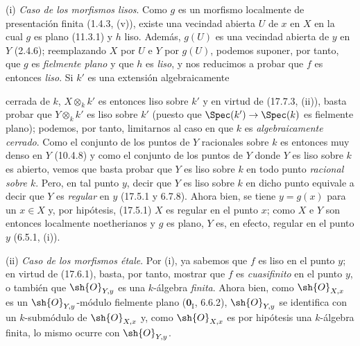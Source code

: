 (i) \emph{Caso de los morfismos lisos}. Como $g$ es un morfismo localmente de presentación finita (1.4.3, (v)), existe una vecindad abierta $U$ de $x$ en $X$ en la cual $g$ es plano (11.3.1) y $h$ liso. Además, $g(U)$ es una vecindad abierta de $y$ en $Y$ (2.4.6); reemplazando $X$ por $U$ e $Y$ por $g(U)$, podemos suponer, por tanto, que $g$ es \emph{fielmente plano} y que $h$ es \emph{liso}, y nos reducimos a probar que $f$ es entonces \emph{liso}. Si $k'$ es una extensión algebraicamente


cerrada de $k$, $X\otimes_k k'$ es entonces liso sobre $k'$ y en virtud de (17.7.3, (ii)), basta probar que $Y\otimes_k k'$ es liso sobre $k'$ (puesto que $\Spec(k')\to\Spec(k)$ es fielmente plano); podemos, por tanto, limitarnos al caso en que $k$ es \emph{algebraicamente cerrado}. Como el conjunto de los puntos de $Y$ racionales sobre $k$ es entonces muy denso en $Y$ (10.4.8) y como el conjunto de los puntos de $Y$ donde $Y$ es liso sobre $k$ es abierto, vemos que basta probar que $Y$ es liso sobre $k$ en todo punto \emph{racional sobre $k$}. Pero, en tal punto $y$, decir que $Y$ es liso sobre $k$ en dicho punto equivale a decir que $Y$ es \emph{regular} en $y$ (17.5.1 y 6.7.8). Ahora bien, se tiene $y=g(x)$ para un $x\in X$ y, por hipótesis, (17.5.1) $X$ es regular en el punto $x$; como $X$ e $Y$ son entonces localmente noetherianos y $g$ es plano, $Y$ es, en efecto, regular en el punto $y$ (6.5.1, (i)).

(ii) \emph{Caso de los morfismos étale}. Por (i), ya sabemos que $f$ es liso en el punto $y$; en virtud de (17.6.1), basta, por tanto, mostrar que $f$ es \emph{cuasifinito} en el punto $y$, o también que $\sh{O}_{Y,y}$ es una $k$-álgebra \emph{finita}. Ahora bien, como $\sh{O}_{X,x}$ es un $\sh{O}_{Y,y}$-módulo fielmente plano ($\mathbf 0_{\mathrm I}$, 6.6.2), $\sh{O}_{Y,y}$ se identifica con un $k$-submódulo de $\sh{O}_{X,x}$ y, como $\sh{O}_{X,x}$ es por hipótesis una $k$-álgebra finita, lo mismo ocurre con $\sh{O}_{Y,y}$.

